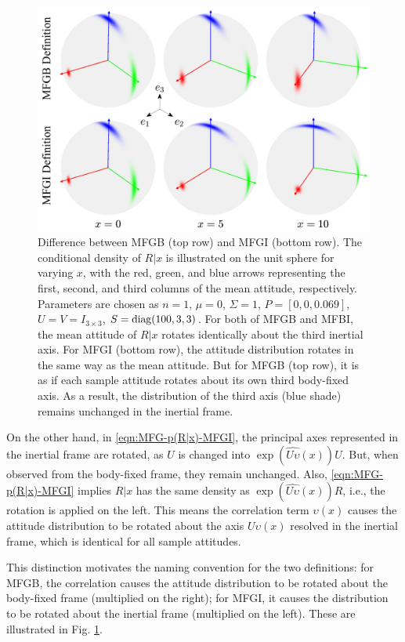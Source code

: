 \begin{figure}
	\centering
	\includegraphics[scale=1.4]{figures/MFG-MFGI-MFGB}
	\caption[Difference between MFGB and MFGI.]{Difference between MFGB (top row) and MFGI (bottom row).
		The conditional density of $R|x$ is illustrated on the unit sphere for varying $x$, with the red, green, and blue arrows representing the first, second, and third columns of the mean attitude, respectively.
		Parameters are chosen as $n=1$, $\mu=0$, $\Sigma=1$, $P = [0,0,0.069]$, $U=V=I_{3\times 3}$, $S = \mathrm{diag}(100,3,3)$.
		For both of MFGB and MFBI, the mean attitude of $R|x$ rotates identically about the third inertial axis.
		For MFGI (bottom row), the attitude distribution rotates in the same way as the mean attitude. 
		But for MFGB (top row), it is as if each sample attitude rotates about its own third body-fixed axis. 
		As a result, the distribution of the third axis (blue shade) remains unchanged in the inertial frame. \label{fig:MFG-MFGI-MFGB}}
\end{figure}

On the other hand, in \eqref{eqn:MFG-p(R|x)-MFGI}, the principal axes represented in the inertial frame are rotated, as $U$ is changed into $\exp(\widehat{U\upsilon}(x))U$. 
But, when observed from the body-fixed frame, they remain unchanged. 
Also, \eqref{eqn:MFG-p(R|x)-MFGI} implies $R|x$ has the same density as $\exp(\widehat{U\upsilon}(x))R$, i.e., the rotation is applied on the left. 
This means the correlation term $\upsilon(x)$ causes the attitude distribution to be rotated about the axis $U\upsilon(x)$ resolved in the inertial frame, which is identical for all sample attitudes.

This distinction motivates the naming convention for the two definitions: for MFGB, the correlation causes the attitude distribution to be rotated about the body-fixed frame (multiplied on the right); for MFGI, it causes the distribution to be rotated about the inertial frame (multiplied on the left).
These are illustrated in Fig. \ref{fig:MFG-MFGI-MFGB}.

